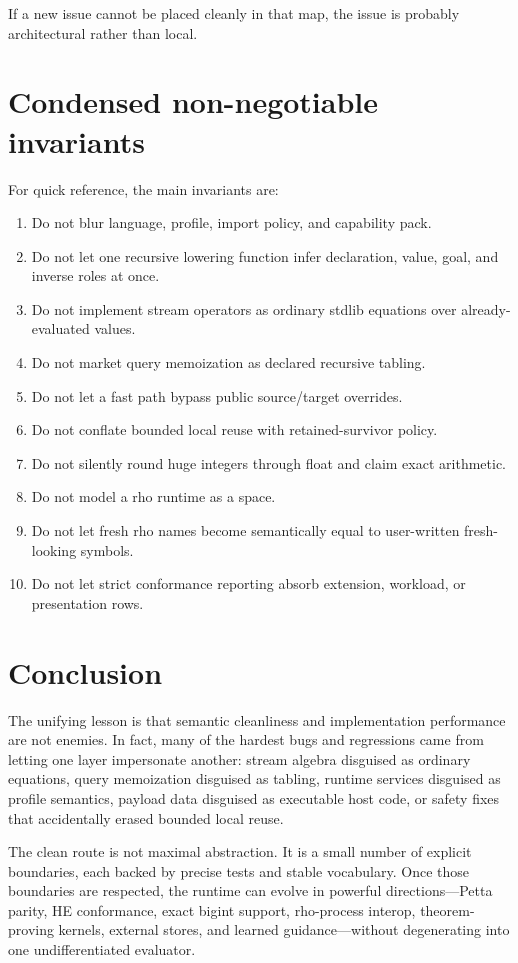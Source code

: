 \documentclass[11pt]{article}
\begin{document}
If a new issue cannot be placed cleanly in that map, the issue is probably architectural rather than local.

\section{Condensed non-negotiable invariants}

For quick reference, the main invariants are:
\begin{enumerate}
    \item Do not blur language, profile, import policy, and capability pack.
    \item Do not let one recursive lowering function infer declaration, value, goal, and inverse roles at once.
    \item Do not implement stream operators as ordinary stdlib equations over already-evaluated values.
    \item Do not market query memoization as declared recursive tabling.
    \item Do not let a fast path bypass public source/target overrides.
    \item Do not conflate bounded local reuse with retained-survivor policy.
    \item Do not silently round huge integers through float and claim exact arithmetic.
    \item Do not model a rho runtime as a space.
    \item Do not let fresh rho names become semantically equal to user-written fresh-looking symbols.
    \item Do not let strict conformance reporting absorb extension, workload, or presentation rows.
\end{enumerate}

\section{Conclusion}

The unifying lesson is that semantic cleanliness and implementation performance are not enemies. In fact, many of the hardest bugs and regressions came from letting one layer impersonate another: stream algebra disguised as ordinary equations, query memoization disguised as tabling, runtime services disguised as profile semantics, payload data disguised as executable host code, or safety fixes that accidentally erased bounded local reuse.

The clean route is not maximal abstraction. It is a small number of explicit boundaries, each backed by precise tests and stable vocabulary. Once those boundaries are respected, the runtime can evolve in powerful directions---Petta parity, HE conformance, exact bigint support, rho-process interop, theorem-proving kernels, external stores, and learned guidance---without degenerating into one undifferentiated evaluator.
\end{document}
